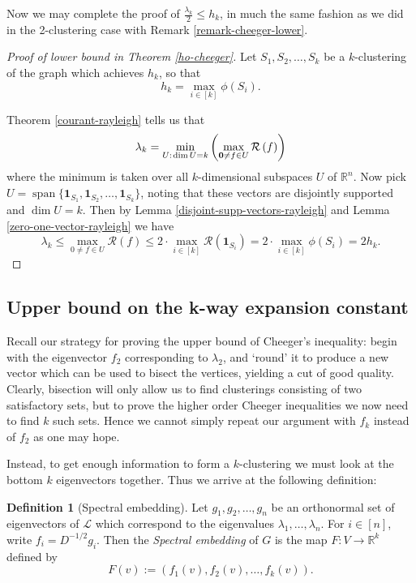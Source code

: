 \documentclass[a4paper,11pt]{article}
\theoremstyle{definition}
\newtheorem{definition}[theorem]{Definition}
\newcommand{\R}{\mathbb{R}}
\renewcommand{\L}{\mathcal{L}}
\newcommand{\rayleigh}[1]{\mathcal{R}\left(#1\right)}
\DeclareMathOperator{\spn}{span}
\begin{document}
Now we may complete the proof of $\frac{\lambda_k}{2} \le h_k$, in much the same fashion as we did in the 2-clustering case with Remark \ref{remark-cheeger-lower}.

\begin{proof}[Proof of lower bound in Theorem \ref{ho-cheeger}]
Let $S_1, S_2, \dots, S_k$ be a $k$-clustering of the graph which achieves $h_k$, so that
\[
h_k = \max_{i \in [k]} \phi(S_i).
\]

Theorem \ref{courant-rayleigh} tells us that
\[
\lambda_k = \min_{U : \hspace{0.1em}\dim{U} = k} \left( \max_{\bm{0} \ne f \in U} \rayleigh{f} \right)
\]
where the minimum is taken over all $k$-dimensional subspaces $U$ of $\R^n$. Now pick $U = \spn \{ \bm{1}_{S_1}, \bm{1}_{S_2}, \dots, \bm{1}_{S_k} \}$, noting that these vectors are disjointly supported and $\dim{U} = k$. Then by Lemma \ref{disjoint-supp-vectors-rayleigh} and Lemma \ref{zero-one-vector-rayleigh} we have
\[
\lambda_k \le \max_{0 \ne f \in U} \rayleigh{f} \le 2 \cdot \max_{i \in [k]} \rayleigh{\bm{1}_{S_i}} = 2 \cdot \max_{i \in [k]} \phi(S_i) = 2h_k.
\]
\end{proof}

\subsection{Upper bound on the k-way expansion constant}

Recall our strategy for proving the upper bound of Cheeger's inequality: begin with the eigenvector $f_2$ corresponding to $\lambda_2$, and `round' it to produce a new vector which can be used to bisect the vertices, yielding a cut of good quality. Clearly, bisection will only allow us to find clusterings consisting of two satisfactory sets, but to prove the higher order Cheeger inequalities we now need to find $k$ such sets. Hence we cannot simply repeat our argument with $f_k$ instead of $f_2$ as one may hope.

Instead, to get enough information to form a $k$-clustering we must look at the bottom $k$ eigenvectors together. Thus we arrive at the following definition:

\begin{definition}[Spectral embedding]\label{spectral-embedding}
Let $g_1, g_2, \dots, g_n$ be an orthonormal set of eigenvectors of $\L$ which correspond to the eigenvalues $\lambda_1, \dots, \lambda_n$. For $i \in [n]$, write $f_i = D^{-1/2}g_i$. Then the \emph{Spectral embedding} of $G$ is the map $F: V \to \R^k$ defined by
\[F(v) := (f_1(v), f_2(v), \dots, f_k(v)).\]
\end{definition}
\end{document}
